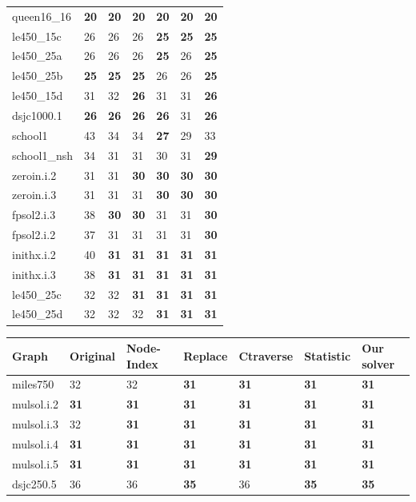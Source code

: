 \documentclass[12pt,a4paper,twoside]{scrartcl}
\numberwithin{equation}{section}
\begin{document}
\begin{landscape}
\begin{table}[]
\begin{tabular}[t]{|p{2.2cm}|p{1.4cm} p{1.4cm}p{1.2cm} p{1.2cm} p{1cm} p{1.2cm}|}
queen16\_16&\textbf{20}&\textbf{20}&\textbf{20}&\textbf{20}&\textbf{20}&\textbf{20}\\ 
le450\_15c&26&26&26&\textbf{25}&\textbf{25}&\textbf{25}\\ \hline
le450\_25a&26&26&26&\textbf{25}&26&\textbf{25}\\
le450\_25b&\textbf{25}&\textbf{25}&\textbf{25}&26&26&\textbf{25}\\
le450\_15d&31&32&\textbf{26}&31&31&\textbf{26}\\ 
dsjc1000.1&\textbf{26}&\textbf{26}&\textbf{26}&\textbf{26}&31&\textbf{26}\\
school1&43&34&34&\textbf{27}&29&33\\ \hline
school1\_nsh&34&31&31&30&31&\textbf{29}\\ 
zeroin.i.2&31&31&\textbf{30}&\textbf{30}&\textbf{30}&\textbf{30}\\ 
zeroin.i.3&31&31&31&\textbf{30}&\textbf{30}&\textbf{30}\\ 
fpsol2.i.3&38&\textbf{30}&\textbf{30}&31&31&\textbf{30}\\
fpsol2.i.2&37&31&31&31&31&\textbf{30}\\ \hline
inithx.i.2&40&\textbf{31}&\textbf{31}&\textbf{31}&\textbf{31}&\textbf{31}\\ 
inithx.i.3&38&\textbf{31}&\textbf{31}&\textbf{31}&\textbf{31}&\textbf{31}\\
le450\_25c&32&32&\textbf{31}&\textbf{31}&\textbf{31}&\textbf{31}\\ 
le450\_25d&32&32&32&\textbf{31}&\textbf{31}&\textbf{31}\\\hline 
\end{tabular}
\begin{tabular}[t]{|p{2.2cm}|p{1.4cm} p{1.4cm}p{1.2cm} p{1.2cm} p{1cm} p{1.2cm}|}
\hline
Graph&Original&Node-Index&Replace&Ctraverse&Statistic&Our solver\\ \hline
miles750&32&32&\textbf{31}&\textbf{31}&\textbf{31}&\textbf{31}\\
mulsol.i.2&\textbf{31}&\textbf{31}&\textbf{31}&\textbf{31}&\textbf{31}&\textbf{31}\\
mulsol.i.3&32&\textbf{31}&\textbf{31}&\textbf{31}&\textbf{31}&\textbf{31}\\
mulsol.i.4&\textbf{31}&\textbf{31}&\textbf{31}&\textbf{31}&\textbf{31}&\textbf{31}\\
mulsol.i.5&\textbf{31}&\textbf{31}&\textbf{31}&\textbf{31}&\textbf{31}&\textbf{31}\\ \hline
dsjc250.5&36&36&\textbf{35}&36&\textbf{35}&\textbf{35}\\

\end{tabular}
\end{table}
\end{landscape}
\end{document}
